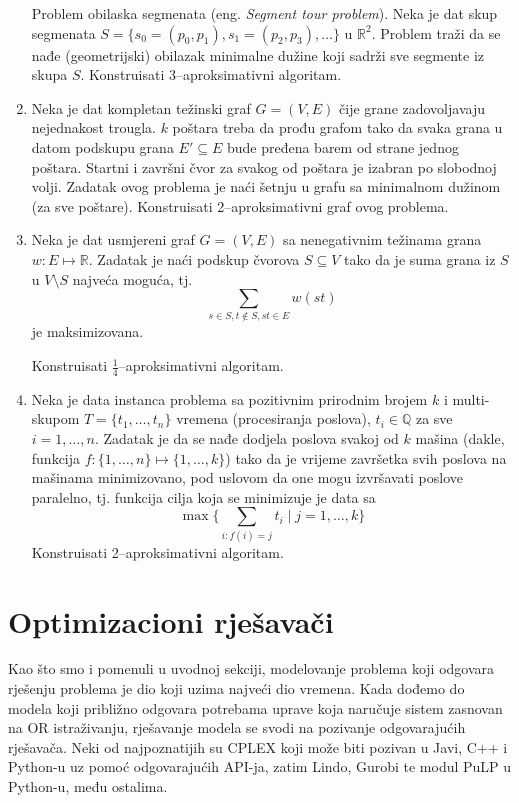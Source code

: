\documentclass[a4paper, utf8, 11pt, colorlinks]{book}
\begin{document}
\begin{enumerate}
		 Problem obilaska segmenata (eng. \emph{Segment tour problem}). Neka je dat skup segmenata $S = \{s_0 = (p_0, p_1), s_1 =(p_2, p_3),\ldots\}$ u $\mathbb{R}^2$. Problem traži da se nađe (geometrijski) obilazak minimalne dužine koji sadrži sve segmente iz skupa $S$. Konstruisati 3--aproksimativni algoritam.  
		 \item Neka je dat kompletan težinski graf $G=(V,E)$ čije grane zadovoljavaju nejednakost trougla. $ k$ poštara treba da prođu grafom tako da svaka grana u datom podskupu grana $E' \subseteq E$ bude pređena barem od strane jednog poštara. Startni i završni čvor za svakog od poštara je izabran po slobodnoj volji. Zadatak ovog problema je naći šetnju u grafu sa minimalnom dužinom (za sve poštare). 
		 Konstruisati 2--aproksimativni graf ovog problema. 
		 \item %
		 Neka je dat usmjereni graf $G = (V,E) $ sa nenegativnim težinama grana $w:E\mapsto\mathbb{R}$. Zadatak je naći  podskup čvorova $S \subseteq V$ tako da je suma grana iz $S$ u $V\setminus S$ najveća moguća, tj. 
		  $$ \sum_{s \in S, t \notin S, st \in E }w(st)$$
		  je maksimizovana.  
		  
		  Konstruisati $\frac{1}{4}$--aproksimativni algoritam.
		 \item  %
		 Neka je data instanca problema sa pozitivnim prirodnim  brojem $k$ i multi-skupom 
		 $T = \{t_1,\ldots, t_n\}$ vremena (procesiranja poslova), $t_i \in \mathbb{Q}$ za sve $i=1,\ldots, n$. 
		 Zadatak je da se nađe dodjela poslova svakoj od $k$ mašina (dakle, funkcija $f:\{1,\ldots, n\} \mapsto \{1,\ldots, k\}$) tako da je vrijeme završetka svih poslova na mašinama minimizovano, pod uslovom da one mogu izvršavati poslove paralelno, tj. funkcija cilja koja se minimizuje je data sa 
		 $$\max \{  \sum_{i: f(i) = j } t_i \mid j=1,\ldots, k \}$$
		 Konstruisati 2--aproksimativni algoritam.
\end{enumerate}



 \chapter{Optimizacioni rješavači}
 
 Kao što smo i pomenuli u uvodnoj sekciji, modelovanje problema koji odgovara rješenju problema je 
 dio koji uzima najveći dio vremena. Kada dođemo do modela koji približno odgovara potrebama uprave 
 koja naručuje sistem zasnovan na OR istraživanju, rješavanje modela se svodi na pozivanje odgovarajućih rješavača. Neki od najpoznatijih su 
 CPLEX koji može biti pozivan u Javi, C++ i Python-u uz pomoć odgovarajućih API-ja, zatim Lindo, Gurobi te modul PuLP u Python-u, među ostalima.  
 
\end{document}
